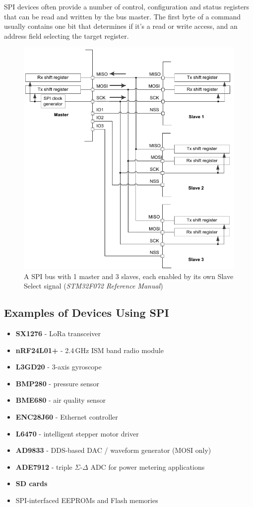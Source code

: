 SPI devices often provide a number of control, configuration and status registers that can be read and written by the bus master. The first byte of a command usually contains one bit that determines if it's a read or write access, and an address field selecting the target register.

\begin{figure}[h]
	\centering
	\includegraphics[width=.7\textwidth] {img/spi-multislave.png}
	\caption[SPI master with multiple slaves]{\label{fig:spi-multislave}A SPI bus with 1 master and 3 slaves, each enabled by its own Slave Select signal (\textit{STM32F072 Reference Manual})}
\end{figure}

\pagebreak[1] %
\subsection{Examples of Devices Using SPI}

\begin{itemize}
	\item \textbf{SX1276} - LoRa transceiver
	\item \textbf{nRF24L01+} - 2.4\,GHz ISM band radio module
	\item \textbf{L3GD20} - 3-axis gyroscope
	\item \textbf{BMP280} - pressure sensor
	\item \textbf{BME680} - air quality sensor
	\item \textbf{ENC28J60} - Ethernet controller
	\item \textbf{L6470} - intelligent stepper motor driver
	\item \textbf{AD9833} - DDS-based DAC / waveform generator (MOSI only)
	\item \textbf{ADE7912} - triple $\Sigma$-$\Delta$ ADC for power metering applications
	\item \textbf{SD cards}
	\item SPI-interfaced EEPROMs and Flash memories	
\end{itemize}

